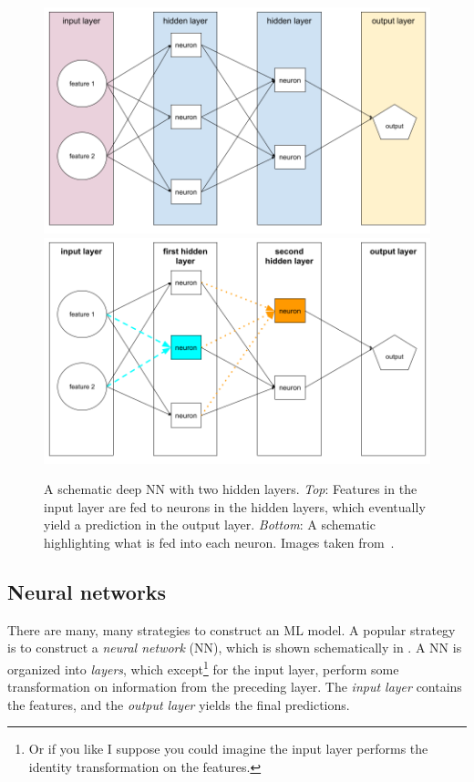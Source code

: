 \begin{figure}
\includegraphics[width=\linewidth]{figs/NeuralNetwork.png}
\includegraphics[width=\linewidth]{figs/Neurons.png}
\caption{A schematic deep NN with two hidden layers.
{\it Top}: Features in the input layer
are fed to neurons in the hidden layers, which eventually yield
a prediction in the output layer. {\it Bottom}: A schematic
highlighting what is fed into each neuron. Images taken 
from~\cite{google_ML}.}
\label{fig:neuralNet}
\end{figure}

\subsection{Neural networks}

There are many, many strategies to construct an ML model.
A popular strategy is to construct a {\it neural network}
(NN), which is shown schematically in . 
A NN is organized into {\it layers}, which except\footnote{Or if you like
I suppose you could imagine the input layer performs the identity
transformation on the features.} for the input layer,
perform some transformation on information from the preceding layer. 
The {\it input layer} contains the features, and
the {\it output layer} yields the final predictions.

